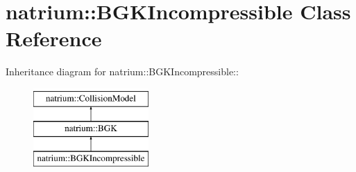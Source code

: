 \hypertarget{classnatrium_1_1BGKIncompressible}{
\section{natrium::BGKIncompressible Class Reference}
\label{classnatrium_1_1BGKIncompressible}
}
Inheritance diagram for natrium::BGKIncompressible::\begin{figure}[H]
\begin{center}
\leavevmode
\includegraphics[height=3cm]{classnatrium_1_1BGKIncompressible}
\end{center}
\end{figure}
